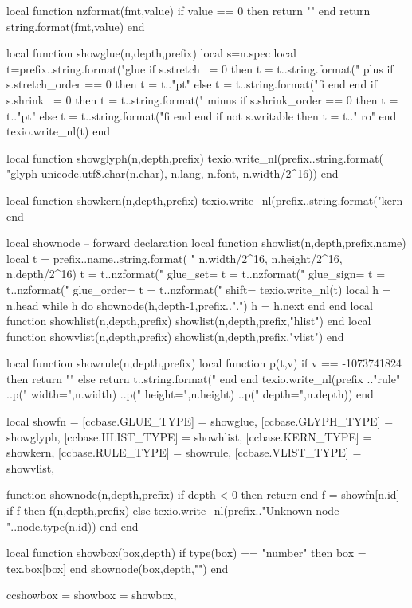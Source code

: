 
%
%
%
\luacode
local function nzformat(fmt,value)
  if value == 0 then return "" end
  return string.format(fmt,value)
end

local function showglue(n,depth,prefix)
  local s=n.spec
  local t=prefix..string.format("glue %
  if s.stretch ~= 0 then
    t = t..string.format(" plus %
    if s.stretch_order == 0 then t = t.."pt"
    else t = t..string.format("fi%
    end
  end
  if s.shrink ~= 0 then
    t = t..string.format(" minus %
    if s.shrink_order == 0 then t = t.."pt"
    else t = t..string.format("fi%
    end
  end
  if not s.writable then t = t.." ro" end
  texio.write_nl(t)
end

local function showglyph(n,depth,prefix)
  texio.write_nl(prefix..string.format(
    "glyph %
    unicode.utf8.char(n.char),
    n.lang, n.font, n.width/2^16))
end

local function showkern(n,depth,prefix)
  texio.write_nl(prefix..string.format("kern %
end

local shownode -- forward declaration
local function showlist(n,depth,prefix,name)
  local t = prefix..name..string.format(
    " %
    n.width/2^16, n.height/2^16, n.depth/2^16)
  t = t..nzformat(" glue_set=%
  t = t..nzformat(" glue_sign=%
  t = t..nzformat(" glue_order=%
  t = t..nzformat(" shift=%
  texio.write_nl(t)
  local h = n.head
  while h do
    shownode(h,depth-1,prefix..".")
    h = h.next
  end
end
local function showhlist(n,depth,prefix) showlist(n,depth,prefix,"hlist") end
local function showvlist(n,depth,prefix) showlist(n,depth,prefix,"vlist") end

local function showrule(n,depth,prefix)
  local function p(t,v)
    if v == -1073741824 then return ""
    else return t..string.format("%
    end
  end
  texio.write_nl(prefix
    .."rule"
    ..p(" width=",n.width)
    ..p(" height=",n.height)
    ..p(" depth=",n.depth))
end

local showfn = {
  [ccbase.GLUE_TYPE]  = showglue,
  [ccbase.GLYPH_TYPE] = showglyph,
  [ccbase.HLIST_TYPE] = showhlist,
  [ccbase.KERN_TYPE]  = showkern,
  [ccbase.RULE_TYPE]  = showrule,
  [ccbase.VLIST_TYPE] = showvlist,
}

function shownode(n,depth,prefix)
  if depth < 0 then return end
  f = showfn[n.id]
  if f then
    f(n,depth,prefix)
  else
    texio.write_nl(prefix.."Unknown node "..node.type(n.id))
  end
end

local function showbox(box,depth)
  if type(box) == "number" then box = tex.box[box] end
  shownode(box,depth,"")
end

ccshowbox = {
  showbox = showbox,
}
\endluacode
\def\ccshowbox#1#2{\directlua{ccshowbox.showbox(#1,#2)}}
\endinput
